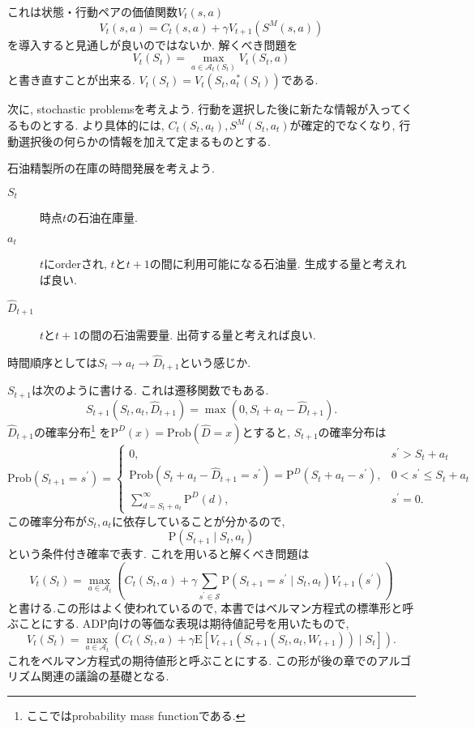 \documentclass[11pt]{jsbook}
\begin{document}
これは状態・行動ペアの価値関数$V_t(s,a)$
\[ V_t(s,a) = C_t(s,a) + \gamma V_{t+1}(S^M(s, a)) \]
を導入すると見通しが良いのではないか. 解くべき問題を
\[ V_t(S_t) = \max_{a \in \mathcal{A}_t(S_t)} V_t(S_t, a) \]
と書き直すことが出来る.
$V_t(S_t) = V_t(S_t, a_t^{*}(S_t))$である.

次に, stochastic problemsを考えよう.
行動を選択した後に新たな情報が入ってくるものとする.
より具体的には, $C_t(S_t, a_t), S^M(S_t, a_t)$が確定的でなくなり,
行動選択後の何らかの情報を加えて定まるものとする.

石油精製所の在庫の時間発展を考えよう.
\begin{description}
	\item[$S_t$] 時点$t$の石油在庫量.
	\item[$a_t$] $t$にorderされ, $t$と$t+1$の間に利用可能になる石油量. 生成する量と考えれば良い.
	\item[$\hat{D}_{t+1}$] $t$と$t+1$の間の石油需要量. 出荷する量と考えれば良い.
\end{description}
時間順序としては$S_t \rightarrow a_t \rightarrow \hat{D}_{t+1}$という感じか.

$S_{t+1}$は次のように書ける. これは遷移関数でもある.
\[ S_{t+1}(S_t, a_t, \hat{D}_{t+1}) = \max \left(0, S_t + a_t - \hat{D}_{t+1} \right). \]
$\hat{D}_{t+1}$の確率分布\footnote{ここではprobability mass functionである.}
を$\mathrm{P}^{D}(x) = \mathrm{Prob}(\hat{D} = x)$とすると,
$S_{t+1}$の確率分布は
\begin{equation*}
	\mathrm{Prob}(S_{t+1}=s^{\prime}) =
	\begin{cases}
		0, &s^{\prime} > S_t + a_t\\
		\mathrm{Prob}(S_t + a_t -\hat{D}_{t+1} = s^{\prime}) = \mathrm{P}^D (S_t + a_t - s^\prime), &0 < s^{\prime} \le S_t + a_t\\
		\sum_{d=S_t + a_t}^{\infty} \mathrm{P}^D (d) , &s^\prime = 0.
	\end{cases}
\end{equation*}
この確率分布が$S_t, a_t$に依存していることが分かるので,
\[ \mathrm{P}(S_{t+1} \mid S_t, a_t) \]
という条件付き確率で表す.
これを用いると解くべき問題は
\begin{equation}
	V_t(S_t) = \max_{a \in \mathcal{A}_t} \left(C_t(S_t,a) +
	 \gamma \sum_{s^\prime \in \mathcal{S}} \mathrm{P}(S_{t+1}=s^\prime \mid S_t, a_t) V_{t+1}(s^\prime) \right)
\end{equation}
と書ける.この形はよく使われているので, 本書ではベルマン方程式の標準形と呼ぶことにする.
ADP向けの等価な表現は期待値記号を用いたもので,
\begin{equation}
	V_t(S_t) = \max_{a \in \mathcal{A}_t} \left(C_t(S_t,a) +
	 \gamma \mathrm{E} \left[ V_{t+1}(S_{t+1}(S_t, a_t, W_{t+1})) \mid S_t\right] \right).
\end{equation}
これをベルマン方程式の期待値形と呼ぶことにする.
この形が後の章でのアルゴリズム関連の議論の基礎となる.
\end{document}
